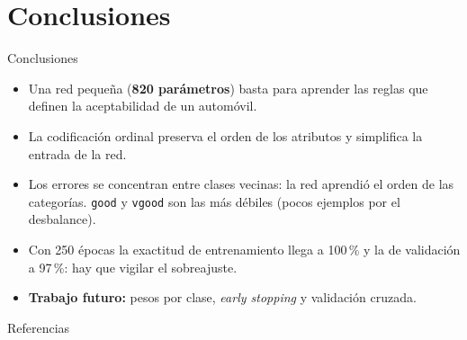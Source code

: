 \documentclass[10pt,aspectratio=169]{beamer}
\begin{document}
\section{Conclusiones}

\begin{frame}{Conclusiones}
  \begin{itemize}
    \setlength{\itemsep}{0.8em}
    \item Una red pequeña (\textbf{820 parámetros}) basta para aprender las
          reglas que definen la aceptabilidad de un automóvil.
    \item La codificación ordinal preserva el orden de los atributos y
          simplifica la entrada de la red.
    \item Los errores se concentran entre clases vecinas: la red aprendió
          el orden de las categorías. \texttt{good} y \texttt{vgood} son las
          más débiles (pocos ejemplos por el desbalance).
    \item Con 250 épocas la exactitud de entrenamiento llega a 100\,\% y la
          de validación a 97\,\%: hay que vigilar el sobreajuste.
    \item \textbf{Trabajo futuro:} pesos por clase, \emph{early stopping} y
          validación cruzada.
  \end{itemize}
\end{frame}

\begin{frame}{Referencias}
  \small
  \printbibliography[heading=none]
\end{frame}

\end{document}
